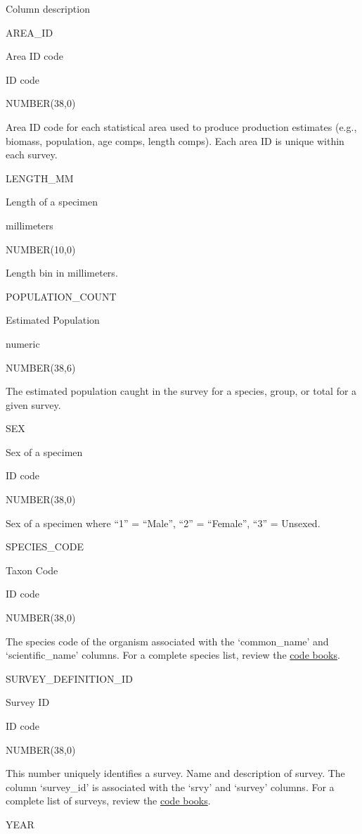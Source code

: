 \documentclass[
  letterpaper,
  oneside,
  open=any]{scrbook}
\begin{document}
Column description

AREA\_ID

Area ID code

ID code

NUMBER(38,0)

Area ID code for each statistical area used to produce production
estimates (e.g., biomass, population, age comps, length comps). Each
area ID is unique within each survey.

LENGTH\_MM

Length of a specimen

millimeters

NUMBER(10,0)

Length bin in millimeters.

POPULATION\_COUNT

Estimated Population

numeric

NUMBER(38,6)

The estimated population caught in the survey for a species, group, or
total for a given survey.

SEX

Sex of a specimen

ID code

NUMBER(38,0)

Sex of a specimen where ``1'' = ``Male'', ``2'' = ``Female'', ``3'' =
Unsexed.

SPECIES\_CODE

Taxon Code

ID code

NUMBER(38,0)

The species code of the organism associated with the `common\_name' and
`scientific\_name' columns. For a complete species list, review the
\href{https://www.fisheries.noaa.gov/resource/document/groundfish-survey-species-code-manual-and-data-codes-manual}{code
books}.

SURVEY\_DEFINITION\_ID

Survey ID

ID code

NUMBER(38,0)

This number uniquely identifies a survey. Name and description of
survey. The column `survey\_id' is associated with the `srvy' and
`survey' columns. For a complete list of surveys, review the
\href{https://www.fisheries.noaa.gov/resource/document/groundfish-survey-species-code-manual-and-data-codes-manual}{code
books}.

YEAR
\end{document}
